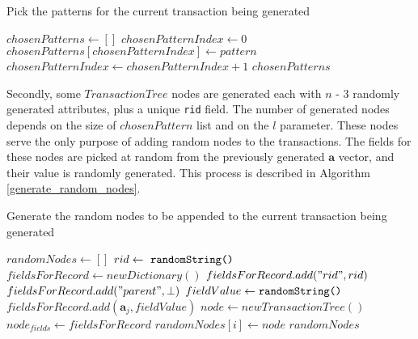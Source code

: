 \documentclass{acm_proc_article-sp-sigmod09}
\begin{document}
\begin{algorithm}
\caption{Pick the patterns for the current transaction being generated}
\label{pick_patterns}
\begin{algorithmic}[1]
\State $chosenPatterns \gets []$
\State $chosenPatternIndex \gets 0$
            \State $chosenPatterns[chosenPatternIndex] \gets pattern$
            \State $chosenPatternIndex \gets chosenPatternIndex + 1$
        \EndIf
    \EndFor
\EndFor
\Return $chosenPatterns$
\EndFunction
\end{algorithmic}
\end{algorithm}

Secondly, some $TransactionTree$ nodes are generated each with $n$ - 3 randomly generated attributes, plus a unique \texttt{rid} field. The number of generated nodes depends on the size of $chosenPattern$ list and on the $l$ parameter. These nodes serve the only purpose of adding random nodes to the transactions. The fields for these nodes are picked at random from the previously generated $\boldsymbol{a}$ vector, and their value is randomly generated. This process is described in Algorithm \ref{generate_random_nodes}.

\begin{algorithm}
\caption{Generate the random nodes to be appended to the current transaction being generated}
\label{generate_random_nodes}
\begin{algorithmic}[1]
\State $randomNodes \gets []$
    \State $rid \gets \text{ \texttt{randomString() }}$
    \State $fieldsForRecord \gets new Dictionary()$
    \State $fieldsForRecord.add("rid", rid)$
    \State $fieldsForRecord.add("parent", \bot)$
        \State $fieldValue \gets \text{\texttt{randomString()}}$
        \State $fieldsForRecord.add(\boldsymbol{a}_j, fieldValue)$
    \EndFor
    \State $node \gets new TransactionTree()$ 
    \State $node_{fields} \gets fieldsForRecord$
    \State $randomNodes[i] \gets node$
\EndFor
\Return $randomNodes$
\EndFunction
\end{algorithmic}
\end{algorithm}
\end{document}
